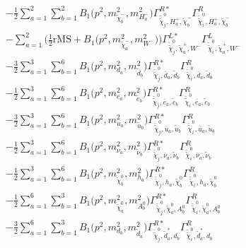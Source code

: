 \begin{itemize}
\begin{align}
 &-\frac{1}{2} \sum_{a=1}^{2}\sum_{b=1}^{2}{B_1\Big(p^{2},m^2_{\tilde{\chi}^-_{{b}}},m^2_{H^-_{{a}}}\Big)} {\Gamma^{R*}_{\check{\tilde{\chi}}^0_{{j}},H^+_{{a}},\tilde{\chi}^-_{{b}}}} {\Gamma^R_{\check{\tilde{\chi}}^0_{{i}},H^+_{{a}},\tilde{\chi}^-_{{b}}}}  \nonumber \\ 
 &- \sum_{a=1}^{2}\Big(\frac{1}{2} \text{rMS}  + {B_1\Big(p^{2},m^2_{\tilde{\chi}^-_{{a}}},m^2_{W^-}\Big)}\Big){\Gamma^{L*}_{\check{\tilde{\chi}}^0_{{j}},\tilde{\chi}^+_{{a}},W^-}} {\Gamma^L_{\check{\tilde{\chi}}^0_{{i}},\tilde{\chi}^+_{{a}},W^-}}  \nonumber \\ 
 &-\frac{3}{2} \sum_{a=1}^{3}\sum_{b=1}^{6}{B_1\Big(p^{2},m^2_{d_{{a}}},m^2_{\tilde{d}_{{b}}}\Big)} {\Gamma^{R*}_{\check{\tilde{\chi}}^0_{{j}},\bar{d}_{{a}},\tilde{d}_{{b}}}} {\Gamma^R_{\check{\tilde{\chi}}^0_{{i}},\bar{d}_{{a}},\tilde{d}_{{b}}}}  \nonumber \\ 
 &-\frac{1}{2} \sum_{a=1}^{3}\sum_{b=1}^{6}{B_1\Big(p^{2},m^2_{e_{{a}}},m^2_{\tilde{e}_{{b}}}\Big)} {\Gamma^{R*}_{\check{\tilde{\chi}}^0_{{j}},\bar{e}_{{a}},\tilde{e}_{{b}}}} {\Gamma^R_{\check{\tilde{\chi}}^0_{{i}},\bar{e}_{{a}},\tilde{e}_{{b}}}}  \nonumber \\ 
 &-\frac{3}{2} \sum_{a=1}^{3}\sum_{b=1}^{6}{B_1\Big(p^{2},m^2_{u_{{a}}},m^2_{\tilde{u}_{{b}}}\Big)} {\Gamma^{R*}_{\check{\tilde{\chi}}^0_{{j}},\bar{u}_{{a}},\tilde{u}_{{b}}}} {\Gamma^R_{\check{\tilde{\chi}}^0_{{i}},\bar{u}_{{a}},\tilde{u}_{{b}}}}  \nonumber \\ 
 &-\frac{1}{2} \sum_{a=1}^{3}\sum_{b=1}^{6}{B_1\Big(p^{2},m^2_{\nu_{{a}}},m^2_{\tilde{\nu}_{{b}}}\Big)} {\Gamma^{R*}_{\check{\tilde{\chi}}^0_{{j}},\bar{\nu}_{{a}},\tilde{\nu}_{{b}}}} {\Gamma^R_{\check{\tilde{\chi}}^0_{{i}},\bar{\nu}_{{a}},\tilde{\nu}_{{b}}}}  \nonumber \\ 
 &-\frac{1}{2} \sum_{a=1}^{3}\sum_{b=1}^{6}{B_1\Big(p^{2},m^2_{\tilde{\chi}^0_{{b}}},m^2_{h_{{a}}}\Big)} {\Gamma^{R*}_{\check{\tilde{\chi}}^0_{{j}},h_{{a}},\tilde{\chi}^0_{{b}}}} {\Gamma^R_{\check{\tilde{\chi}}^0_{{i}},h_{{a}},\tilde{\chi}^0_{{b}}}}  \nonumber \\ 
 &-\frac{1}{2} \sum_{a=1}^{6}\sum_{b=1}^{3}{B_1\Big(p^{2},m^2_{\tilde{\chi}^0_{{a}}},m^2_{A^0_{{b}}}\Big)} {\Gamma^{R*}_{\check{\tilde{\chi}}^0_{{j}},\tilde{\chi}^0_{{a}},A^0_{{b}}}} {\Gamma^R_{\check{\tilde{\chi}}^0_{{i}},\tilde{\chi}^0_{{a}},A^0_{{b}}}}  \nonumber \\ 
 &-\frac{3}{2} \sum_{a=1}^{6}\sum_{b=1}^{3}{B_1\Big(p^{2},m^2_{d_{{b}}},m^2_{\tilde{d}_{{a}}}\Big)} {\Gamma^{R*}_{\check{\tilde{\chi}}^0_{{j}},\tilde{d}^*_{{a}},d_{{b}}}} {\Gamma^R_{\check{\tilde{\chi}}^0_{{i}},\tilde{d}^*_{{a}},d_{{b}}}}  \nonumber \\ 

\end{align}
\end{itemize}
